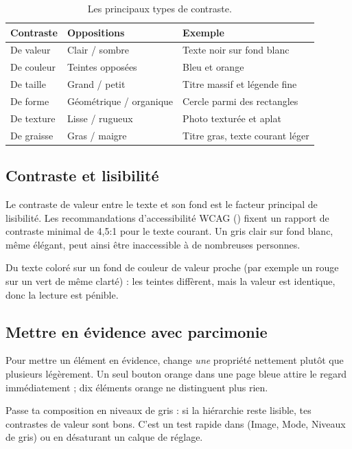 \begin{table}[h!]
\centering
\begin{tabular}{@{}p{3.2cm}p{4.5cm}p{6.3cm}@{}}
\toprule
\textbf{Contraste} & \textbf{Oppositions} & \textbf{Exemple} \\
\midrule
De valeur & Clair / sombre & Texte noir sur fond blanc \\
De couleur & Teintes opposées & Bleu et orange \\
De taille & Grand / petit & Titre massif et légende fine \\
De forme & Géométrique / organique & Cercle parmi des rectangles \\
De texture & Lisse / rugueux & Photo texturée et aplat \\
De graisse & Gras / maigre & Titre gras, texte courant léger \\
\bottomrule
\end{tabular}
\caption{Les principaux types de contraste.}
\end{table}

\subsection{Contraste et lisibilité}

Le contraste de valeur entre le texte et son fond est le facteur principal de lisibilité. Les recommandations d'accessibilité WCAG () fixent un rapport de contraste minimal de 4,5:1 pour le texte courant. Un gris clair sur fond blanc, même élégant, peut ainsi être inaccessible à de nombreuses personnes.

\begin{erreur}
Du texte coloré sur un fond de couleur de valeur proche (par exemple un rouge sur un vert de même clarté) : les teintes diffèrent, mais la valeur est identique, donc la lecture est pénible.
\end{erreur}

\subsection{Mettre en évidence avec parcimonie}

Pour mettre un élément en évidence, change \emph{une} propriété nettement plutôt que plusieurs légèrement. Un seul bouton orange dans une page bleue attire le regard immédiatement ; dix éléments orange ne distinguent plus rien.

\begin{astuce}
Passe ta composition en niveaux de gris : si la hiérarchie reste lisible, tes contrastes de valeur sont bons. C'est un test rapide dans  (Image, Mode, Niveaux de gris) ou en désaturant un calque de réglage.
\end{astuce}

